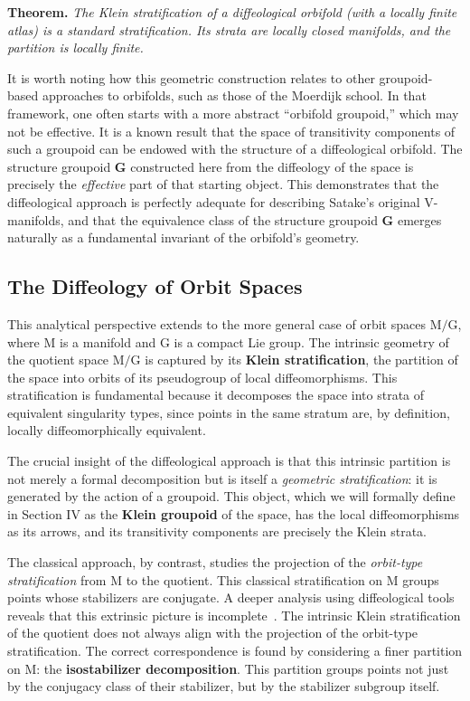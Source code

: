 \documentclass[10pt,reqno,letterpaper,twoside]{amsart}
\theoremstyle{article}
\newenvironment{theorem}[1]%
{\noindent\textbf{Theorem#1.} \it}%
{}
\newcommand{\GG}{\mathbf{G}}
\def \G{\mathrm G}
\def \M{\mathrm M}
\begin{document}
  \begin{theorem}{}
    The Klein stratification of a diffeological orbifold (with a locally finite atlas) is a standard stratification. Its strata are locally closed manifolds, and the partition is locally finite.
  \end{theorem}
  
  It is worth noting how this geometric construction relates to other groupoid-based approaches to orbifolds,
  such as those of the Moerdijk school.
  In that framework,
  one often starts with a more abstract ``orbifold groupoid,''
  which may not be effective.
  It is a known result that the space of transitivity components of such a groupoid can be endowed with the structure of a diffeological orbifold.
  The structure groupoid $\GG$ constructed here from the diffeology of the space is precisely the \emph{effective} part of that starting object.
  This demonstrates that the diffeological approach is perfectly adequate for describing Satake's original V-manifolds,
  and that the equivalence class of the structure groupoid $\GG$ emerges naturally as a fundamental invariant of the orbifold's geometry.
  
  \subsection{The Diffeology of Orbit Spaces}
  
  This analytical perspective extends to the more general case of orbit spaces $\M/\G$,
  where $\M$ is a manifold and $\G$ is a compact Lie group.
  The intrinsic geometry of the quotient space $\M/\G$ is captured by its \textbf{Klein stratification},
  the partition of the space into orbits of its pseudogroup of local diffeomorphisms.
  This stratification is fundamental because it decomposes the space into strata of equivalent singularity types,
  since points in the same stratum are,
  by definition,
  locally diffeomorphically equivalent.
  
  The crucial insight of the diffeological approach is that this intrinsic partition is not merely a formal decomposition but is itself a \emph{geometric stratification}:
  it is generated by the action of a groupoid.
  This object,
  which we will formally define in Section IV as the \textbf{Klein groupoid} of the space,
  has the local diffeomorphisms as its arrows, and its transitivity components are precisely the Klein strata.
  
  The classical approach,
  by contrast,
  studies the projection of the \emph{orbit-type stratification} from $\M$ to the quotient.
  This classical stratification on $\M$ groups points whose stabilizers are conjugate.
  A deeper analysis using diffeological tools reveals that this extrinsic picture is incomplete~\cite{GIZ25}.
  The intrinsic Klein stratification of the quotient does not always align with the projection of the orbit-type stratification.
  The correct correspondence is found by considering a finer partition on $\M$:
  the \textbf{isostabilizer decomposition}.
  This partition groups points not just by the conjugacy class of their stabilizer,
  but by the stabilizer subgroup itself.
  
\end{document}
